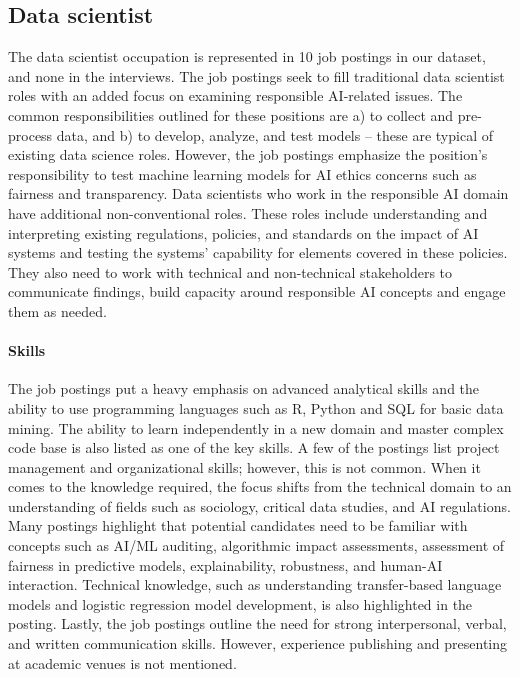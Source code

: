 \documentclass[sigconf]{acmart}
\begin{document}
\subsection{Data scientist}
The data scientist occupation is represented in 10 job postings in our dataset, and none in the interviews. 
The job postings seek to fill traditional data scientist roles with an added focus on examining responsible \ac{AI}-related issues. The common responsibilities outlined for these positions are a) to collect and pre-process data, and b) to develop, analyze, and test models -- these are typical of existing data science roles. However, the job postings emphasize the position's responsibility to test machine learning models for \ac{AI} ethics concerns such as fairness and transparency. Data scientists who work in the responsible AI domain have additional non-conventional roles. These roles include understanding and interpreting existing regulations, policies, and standards on the impact of \ac{AI} systems and testing the systems' capability for elements covered in these policies. They also need to work with technical and non-technical stakeholders to communicate findings, build capacity around responsible AI concepts and engage them as needed. %

\paragraph{Skills}
The job postings put a heavy emphasis on advanced analytical skills and the ability to use programming languages such as R, Python and SQL for basic data mining. The ability to learn independently in a new domain and master complex code base is also listed as one of the key skills. A few of the postings list project management and organizational skills; however, this is not common. When it comes to the knowledge required, the focus shifts from the technical domain to an understanding of fields such as sociology, critical data studies, and AI regulations. Many postings highlight that potential candidates need to be familiar with concepts such as \ac{AI}/ML auditing, algorithmic impact assessments, assessment of fairness in predictive models, explainability, robustness, and human-\ac{AI} interaction. Technical knowledge, such as understanding transfer-based language models and logistic regression model development, is also highlighted in the posting. Lastly, the job postings outline the need for strong interpersonal, verbal, and written communication skills. However, experience publishing and presenting at academic venues is not mentioned. 
\end{document}
